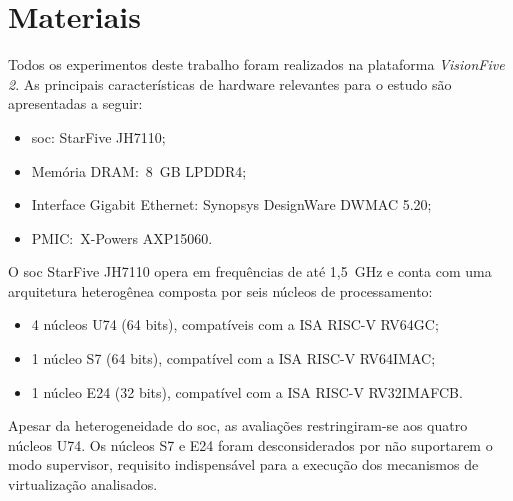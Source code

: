 \section{Materiais}

Todos os experimentos deste trabalho foram realizados na plataforma \textit{VisionFive 2}. As principais características de hardware relevantes para o estudo são apresentadas a seguir:

\begin{itemize}
    \item \gls{soc}: StarFive JH7110;
    \item Memória DRAM:~8~GB LPDDR4;
    \item Interface Gigabit Ethernet: Synopsys DesignWare DWMAC 5.20;
    \item PMIC:~X-Powers AXP15060.
\end{itemize}

O \gls{soc} StarFive JH7110 opera em frequências de até 1,5~GHz e conta com uma arquitetura heterogênea composta por seis núcleos de processamento:

\begin{itemize}
    \item 4 núcleos U74 (64 bits), compatíveis com a ISA RISC-V RV64GC;
    \item 1 núcleo S7 (64 bits), compatível com a ISA RISC-V RV64IMAC;
    \item 1 núcleo E24 (32 bits), compatível com a ISA RISC-V RV32IMAFCB.
\end{itemize}

Apesar da heterogeneidade do \gls{soc}, as avaliações restringiram-se aos quatro núcleos U74. Os núcleos S7 e E24 foram desconsiderados por não suportarem o modo supervisor, requisito indispensável
para a execução dos mecanismos de virtualização analisados.
